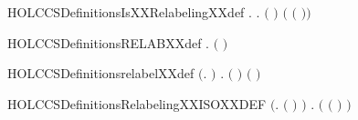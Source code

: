 \newcommand{\HOLCCSDefinitionsISXXPROCXXdef}{\UseVerbatim{HOLCCSDefinitionsISXXPROCXXdef}}
\begin{SaveVerbatim}{HOLCCSDefinitionsIsXXRelabelingXXdef}
\HOLTokenTurnstile{} \HOLSymConst{\HOLTokenForall{}}.   \HOLSymConst{\HOLTokenEquiv{}} \HOLSymConst{\HOLTokenForall{}}.  \ensuremath{(} \ensuremath{)} \HOLSymConst{\ensuremath{=}}  \ensuremath{(} \ensuremath{(} \ensuremath{)}\ensuremath{)}
\end{SaveVerbatim}
\newcommand{\HOLCCSDefinitionsIsXXRelabelingXXdef}{\UseVerbatim{HOLCCSDefinitionsIsXXRelabelingXXdef}}
\begin{SaveVerbatim}{HOLCCSDefinitionsRELABXXdef}
\HOLTokenTurnstile{} \HOLSymConst{\HOLTokenForall{}}.   \HOLSymConst{\ensuremath{=}}  \ensuremath{(} \ensuremath{)}
\end{SaveVerbatim}
\newcommand{\HOLCCSDefinitionsRELABXXdef}{\UseVerbatim{HOLCCSDefinitionsRELABXXdef}}
\begin{SaveVerbatim}{HOLCCSDefinitionsrelabelXXdef}
\HOLTokenTurnstile{} \ensuremath{(}\HOLSymConst{\HOLTokenForall{}}.   \HOLConst{\ensuremath{\tau}} \HOLSymConst{\ensuremath{=}} \HOLConst{\ensuremath{\tau}}\ensuremath{)} \HOLSymConst{\HOLTokenConj{}}
   \HOLSymConst{\HOLTokenForall{}} .   \ensuremath{(} \ensuremath{)} \HOLSymConst{\ensuremath{=}}  \ensuremath{(}  \ensuremath{)}
\end{SaveVerbatim}
\newcommand{\HOLCCSDefinitionsrelabelXXdef}{\UseVerbatim{HOLCCSDefinitionsrelabelXXdef}}
\begin{SaveVerbatim}{HOLCCSDefinitionsRelabelingXXISOXXDEF}
\HOLTokenTurnstile{} \ensuremath{(}\HOLSymConst{\HOLTokenForall{}}.  \ensuremath{(} \ensuremath{)} \HOLSymConst{\ensuremath{=}} \ensuremath{)} \HOLSymConst{\HOLTokenConj{}}
   \HOLSymConst{\HOLTokenForall{}}.   \HOLSymConst{\HOLTokenEquiv{}}
       \ensuremath{(} \ensuremath{(} \ensuremath{)} \HOLSymConst{\ensuremath{=}} \ensuremath{)}
\end{SaveVerbatim}
